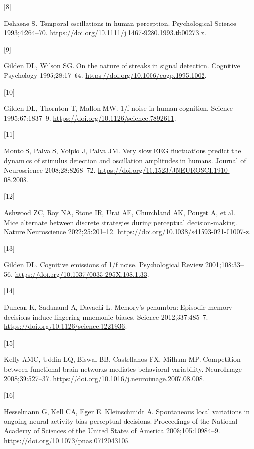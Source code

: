 \documentclass[
]{article}
\newlength{\cslhangindent}
\newlength{\csllabelwidth}
\newlength{\cslentryspacingunit} %
\newenvironment{CSLReferences}[2] %
 {%
  \setlength{\parindent}{0pt}
  \ifodd #1
  \let\oldpar\par
  \def\par{\hangindent=\cslhangindent\oldpar}
  \fi
  \setlength{\parskip}{#2\cslentryspacingunit}
 }%
 {}
\newcommand{\CSLLeftMargin}[1]{\parbox[t]{\csllabelwidth}{#1}}
\newcommand{\CSLRightInline}[1]{\parbox[t]{\linewidth - \csllabelwidth}{#1}\break}
\begin{document}
\begin{CSLReferences}{0}{0}
\leavevmode{}%
\CSLLeftMargin{{[}8{]} }%
\CSLRightInline{Dehaene S. Temporal oscillations in human perception.
Psychological Science 1993;4:264--70.
\url{https://doi.org/10.1111/j.1467-9280.1993.tb00273.x}.}

\leavevmode{}%
\CSLLeftMargin{{[}9{]} }%
\CSLRightInline{Gilden DL, Wilson SG. On the nature of streaks in signal
detection. Cognitive Psychology 1995;28:17--64.
\url{https://doi.org/10.1006/cogp.1995.1002}.}

\leavevmode{}%
\CSLLeftMargin{{[}10{]} }%
\CSLRightInline{Gilden DL, Thornton T, Mallon MW. 1/f noise in human
cognition. Science 1995;67:1837--9.
\url{https://doi.org/10.1126/science.7892611}.}

\leavevmode{}%
\CSLLeftMargin{{[}11{]} }%
\CSLRightInline{Monto S, Palva S, Voipio J, Palva JM. Very slow EEG
fluctuations predict the dynamics of stimulus detection and oscillation
amplitudes in humans. Journal of Neuroscience 2008;28:8268--72.
\url{https://doi.org/10.1523/JNEUROSCI.1910-08.2008}.}

\leavevmode{}%
\CSLLeftMargin{{[}12{]} }%
\CSLRightInline{Ashwood ZC, Roy NA, Stone IR, Urai AE, Churchland AK,
Pouget A, et al. Mice alternate between discrete strategies during
perceptual decision-making. Nature Neuroscience 2022;25:201--12.
\url{https://doi.org/10.1038/s41593-021-01007-z}.}

\leavevmode{}%
\CSLLeftMargin{{[}13{]} }%
\CSLRightInline{Gilden DL. Cognitive emissions of 1/f noise.
Psychological Review 2001;108:33--56.
\url{https://doi.org/10.1037/0033-295X.108.1.33}.}

\leavevmode{}%
\CSLLeftMargin{{[}14{]} }%
\CSLRightInline{Duncan K, Sadanand A, Davachi L. Memory's penumbra:
Episodic memory decisions induce lingering mnemonic biases. Science
2012;337:485--7. \url{https://doi.org/10.1126/science.1221936}.}

\leavevmode{}%
\CSLLeftMargin{{[}15{]} }%
\CSLRightInline{Kelly AMC, Uddin LQ, Biswal BB, Castellanos FX, Milham
MP. Competition between functional brain networks mediates behavioral
variability. NeuroImage 2008;39:527--37.
\url{https://doi.org/10.1016/j.neuroimage.2007.08.008}.}

\leavevmode{}%
\CSLLeftMargin{{[}16{]} }%
\CSLRightInline{Hesselmann G, Kell CA, Eger E, Kleinschmidt A.
Spontaneous local variations in ongoing neural activity bias perceptual
decisions. Proceedings of the National Academy of Sciences of the United
States of America 2008;105:10984--9.
\url{https://doi.org/10.1073/pnas.0712043105}.}


\end{CSLReferences}
\end{document}

